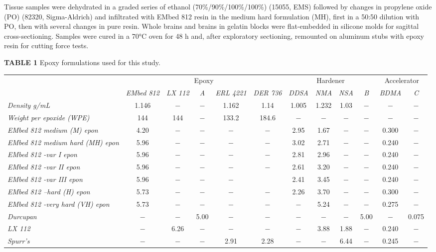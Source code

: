 \documentclass{article}
\begin{document}
Tissue samples were dehydrated in a graded series of ethanol (70\%/90\%/100\%/100\%) (15055, EMS) followed by changes in propylene oxide (PO) (82320, Sigma-Aldrich) and infiltrated with EMbed 812 resin in the medium hard formulation (MH), first in a 50:50 dilution with PO, then with several changes in pure resin. Whole brains and brains in gelatin blocks were flat-embedded in silicone molds for sagittal cross-sectioning. Samples were cured in a 70°C oven for 48 h and, after exploratory sectioning, remounted on aluminum stubs with epoxy resin for cutting force tests.

\noindent\textbf{TABLE 1} Epoxy formulations used for this study.

\begin{center}\footnotesize
\setlength{\tabcolsep}{3pt}
\begin{tabular}{l*{11}{c}}
\toprule
 & \multicolumn{5}{c}{Epoxy} & \multicolumn{4}{c}{Hardener} & \multicolumn{2}{c}{Accelerator} \\
\cmidrule(lr){2-6}\cmidrule(lr){7-10}\cmidrule(lr){11-12}
 & \emph{EMbed 812} & \emph{LX 112} & \emph{A} & \emph{ERL 4221} & \emph{DER 736} & \emph{DDSA} & \emph{NMA} & \emph{NSA} & \emph{B} & \emph{BDMA} & \emph{C} \\
\midrule
\emph{Density g/mL} & 1.146 & − & − & 1.162 & 1.14 & 1.005 & 1.232 & 1.03 & − & − & − \\
\emph{Weight per epoxide (WPE)} & 144 & 144 & − & 133.2 & 184.6 & − & − & − & − & − & − \\
\emph{EMbed 812 medium (M) epon} & 4.20 & − & − & − & − & 2.95 & 1.67 & − & − & 0.300 & − \\
\emph{EMbed 812 medium hard (MH) epon} & 5.96 & − & − & − & − & 3.02 & 2.71 & − & − & 0.240 & − \\
\emph{EMbed 812 -var I epon} & 5.96 & − & − & − & − & 2.81 & 2.96 & − & − & 0.240 & − \\
\emph{EMbed 812 -var II epon} & 5.96 & − & − & − & − & 2.61 & 3.20 & − & − & 0.240 & − \\
\emph{EMbed 812 -var III epon} & 5.96 & − & − & − &  & 2.41 & 3.45 & − & − & 0.240 & − \\
\emph{EMbed 812 –hard (H) epon} & 5.73 & − & − & − & − & 2.26 & 3.70 & − & − & 0.300 & − \\
\emph{EMbed 812 -very hard (VH) epon} & 5.73 & − & − & − & − & − & 5.24 & − & − & 0.275 & − \\
\emph{Durcupan} & − & − & 5.00 & − & − & − & − & − & 5.00 & − & 0.075 \\
\emph{LX 112} & − & 6.26 & − & − & − & − & 3.88 & 1.88 & − & 0.240 & − \\
\emph{Spurr’s} & − & − & − & 2.91 & 2.28 & − & − & 6.44 & − & 0.245 & − \\
\bottomrule
\end{tabular}
\end{center}
\end{document}

